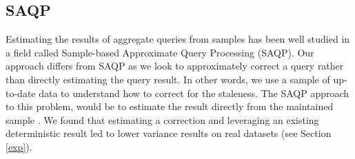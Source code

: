 \subsection{SAQP}
Estimating the results of aggregate queries from samples has been
well studied in a field called Sample-based Approximate Query Processing
(SAQP). 
Our approach differs from SAQP as we look to
approximately correct a query rather than directly estimating the query result.
In other words, we use a sample of up-to-date data to understand how to correct for the
staleness. 
The SAQP approach to this problem, would be to
estimate the result directly from the maintained sample \cite{joshi2008materialized}.
We found that estimating
a correction and leveraging an existing deterministic result led
to lower variance results on real datasets (see Section \ref{exp}). 


